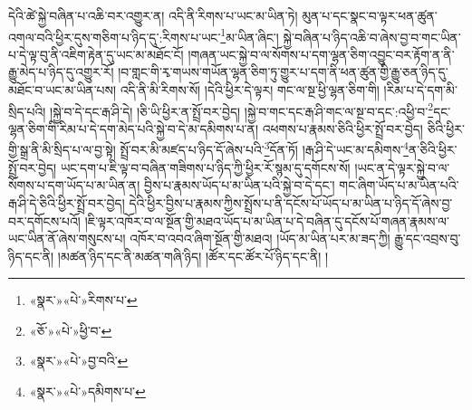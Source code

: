 དེའི་ཚེ་སྐྱེ་བཞིན་པ་འཆི་བར་འགྱུར་ན། འདི་ནི་རིགས་པ་ཡང་མ་ཡིན་ཏེ། མུན་པ་དང་སྣང་བ་ལྟར་ཕན་ཚུན་འགལ་བའི་ཕྱིར་དུས་གཅིག་པ་ཉིད་དུ་:རིགས་པ་ཡང་\footnote{«སྣར་»«པེ་»རིགས་པ་}མ་ཡིན་ཞིང་། སྐྱེ་བཞིན་པ་ཉིད་འཆི་བ་ཞེས་བྱ་བ་གང་ཡིན་པ་དེ་ལྟ་བུ་ནི་འཇིག་རྟེན་དུ་ཡང་མ་མཐོང་ངོ། །གཞན་ཡང་སྐྱེ་བ་ལ་སོགས་པ་དག་ལྷན་ཅིག་འབྱུང་བར་རྟོག་ན་ནི་རྒྱུ་མེད་པ་ཉིད་དུ་འགྱུར་རོ། །བ་གླང་གི་རྭ་གཡས་གཡོན་ལྷན་ཅིག་ཏུ་གྱུར་པ་དག་ནི་ཕན་ཚུན་གྱི་རྒྱུ་ཅན་ཉིད་དུ་མཐོང་བ་ཡང་མ་ཡིན་པས། འདི་ནི་མི་རིགས་སོ། །དེའི་ཕྱིར་དེ་ལྟར། གང་ལ་སྔ་ཕྱི་ལྷན་ཅིག་གི། །རིམ་པ་དེ་དག་མི་སྲིད་པའི། །སྐྱེ་བ་དེ་དང་རྒ་ཤི་དེ། །ཅི་ཡི་ཕྱིར་ན་སྤྲོ་བར་བྱེད། །སྐྱེ་བ་གང་དང་རྒ་ཤི་གང་ལ་སྔ་བ་དང་:འཕྱི་བ་\footnote{«ཅོ་»«པེ་»ཕྱི་བ་}དང་ལྷན་ཅིག་གི་རིམ་པ་དེ་དག་མེད་པའི་སྐྱེ་བ་དེ་མ་དམིགས་པ་ན། འཕགས་པ་རྣམས་ཅིའི་ཕྱིར་སྤྲོ་བར་བྱེད། ཅིའི་ཕྱིར་གྱི་སྒྲ་ནི་མི་སྲིད་པ་ལ་བྱ་སྟེ། སྤྲོ་བར་མི་མཛད་པ་ཉིད་དོ་ཞེས་པའི་\footnote{«སྣར་»«པེ་»བྱ་བའི་}དོན་ཏོ། །རྒ་ཤི་དེ་ཡང་མ་དམིགས་\footnote{«སྣར་»«པེ་»དམིགས་པ་}ན་ཅིའི་ཕྱིར་སྤྲོ་བར་བྱེད། ཡང་དག་པ་ཇི་ལྟ་བ་བཞིན་གཟིགས་པ་ཉིད་ཀྱི་ཕྱིར་རོ་སྙམ་དུ་དགོངས་སོ། །ཡང་ན་དེ་ལྟར་སྐྱེ་བ་ལ་སོགས་པ་དག་ཡོད་པ་མ་ཡིན་ན། བྱིས་པ་རྣམས་ཡོད་པ་མ་ཡིན་པའི་སྐྱེ་བ་དེ་དང་། གང་ཞིག་ཡོད་པ་མ་ཡིན་པའི་རྒ་ཤི་དེ་ཅིའི་ཕྱིར་སྤྲོ་བར་བྱེད། དེའི་ཕྱིར་བྱིས་པ་རྣམས་ཀྱིས་སྤྲོས་པ་ནི་དངོས་པོ་ཡོད་པ་མ་ཡིན་པ་ཉིད་དོ་ཞེས་བྱ་བར་དགོངས་པའོ། །ཇི་ལྟར་འཁོར་བ་ལ་སྔོན་གྱི་མཐའ་ཡོད་པ་མ་ཡིན་པ་དེ་བཞིན་དུ་དངོས་པོ་གཞན་རྣམས་ལ་ཡང་ཡིན་ནོ་ཞེས་གསུངས་པ། འཁོར་བ་འབའ་ཞིག་སྔོན་གྱི་མཐའ། །ཡོད་མ་ཡིན་པར་མ་ཟད་ཀྱི། རྒྱུ་དང་འབྲས་བུ་ཉིད་དང་ནི། །མཚན་ཉིད་དང་ནི་མཚན་གཞི་ཉིད། །ཚོར་དང་ཚོར་པོ་ཉིད་དང་ནི། །

